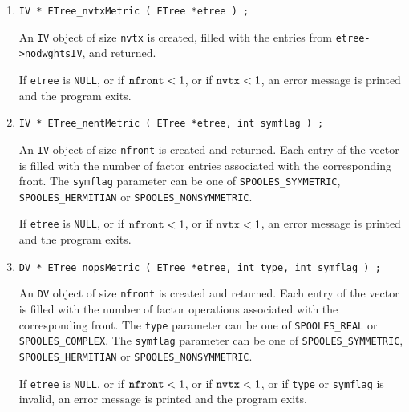 \begin{enumerate}
\item
\begin{verbatim}
IV * ETree_nvtxMetric ( ETree *etree ) ;
\end{verbatim}
An {\tt IV} object of size {\tt nvtx} is created,
filled with the entries from {\tt etree->nodwghtsIV},
and returned.
\par {}
If {\tt etree} is {\tt NULL},
or if ${\tt nfront} < 1$,
or if ${\tt nvtx} < 1$,
an error message is printed and the program exits.
\item
\begin{verbatim}
IV * ETree_nentMetric ( ETree *etree, int symflag ) ;
\end{verbatim}
An {\tt IV} object of size {\tt nfront} is created and returned.
Each entry of the vector is filled with the number of factor
entries associated with the corresponding front.
The {\tt symflag} parameter can be one of {\tt SPOOLES\_SYMMETRIC},
{\tt SPOOLES\_HERMITIAN} or {\tt SPOOLES\_NONSYMMETRIC}.
\par {}
If {\tt etree} is {\tt NULL},
or if ${\tt nfront} < 1$,
or if ${\tt nvtx} < 1$,
an error message is printed and the program exits.
\item
\begin{verbatim}
DV * ETree_nopsMetric ( ETree *etree, int type, int symflag ) ;
\end{verbatim}
An {\tt DV} object of size {\tt nfront} is created and returned.
Each entry of the vector is filled with the number of factor
operations associated with the corresponding front.
The {\tt type} parameter can be one of {\tt SPOOLES\_REAL} or
{\tt SPOOLES\_COMPLEX}.
The {\tt symflag} parameter can be one of {\tt SPOOLES\_SYMMETRIC},
{\tt SPOOLES\_HERMITIAN} or {\tt SPOOLES\_NONSYMMETRIC}.
\par {}
If {\tt etree} is {\tt NULL},
or if ${\tt nfront} < 1$,
or if ${\tt nvtx} < 1$,
or if {\tt type} or {\tt symflag} is invalid,
an error message is printed and the program exits.
\end{enumerate}
\par
